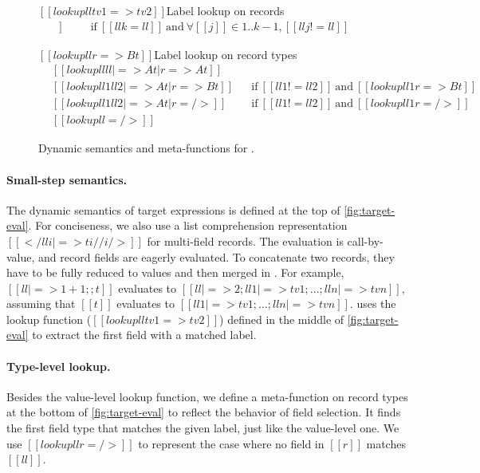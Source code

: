 \begin{figure}
  \small
  \ottdefnsTargetStep

  \begin{rulesection}{$[[ lookup ll tv1 => tv2]]$}{Label lookup on records}
    \begin{align*}
      [[ lookup ll { ll1 |=> tv1 ; ... ; lln |=> tvn }  => tvk ]]\;\;\qquad
      \text{if}\ [[llk=ll]]\ \text{and}\ \forall [[j]] \in 1 .. k\!\!-\!\!1, [[llj != ll]]\;\;
    \end{align*}
  \end{rulesection}

  \begin{rulesection}{$[[ lookup ll r => Bt]]$}{Label lookup on record types}
    \begin{align*}
      &[[ lookup ll {ll |=>At | r} => At ]]&&\\
      &[[ lookup ll1 {ll2 |=>At | r} => Bt ]]&&\text{if}\ [[ll1 != ll2]]\ \text{and}\ [[ lookup ll1 r => Bt ]]\\
      &[[ lookup ll1 {ll2 |=>At | r} =/> ]]&&\text{if}\ [[ll1 != ll2]]\ \text{and}\ [[ lookup ll1 r =/> ]]\\
      &[[ lookup ll {} =/> ]]&&
    \end{align*}
  \end{rulesection}

  \caption{Dynamic semantics and meta-functions for \lambdar.}
  \label{fig:target-eval}
\end{figure}

\paragraph{Small-step semantics.}
The dynamic semantics of target expressions is defined at the top of
\autoref{fig:target-eval}. For conciseness, we also use a list comprehension
representation $[[ { </ lli |=> ti // i /> } ]]$ for multi-field records. The
evaluation is call-by-value, and record fields are eagerly evaluated. To
concatenate two records, they have to be fully reduced to values and then merged
in . For example, $[[{ ll|=>1+1 } ;; t]]$ evaluates to
$[[{ ll |=> 2 ; ll1 |=> tv1 ; ... ; lln |=> tvn }]]$, assuming that $[[t]]$
evaluates to $[[{ ll1 |=> tv1 ; ... ; lln |=> tvn }]]$. 
uses the lookup function ($[[lookup ll tv1 => tv2]]$) defined in the middle of
\autoref{fig:target-eval} to extract the first field with a matched label.

\paragraph{Type-level lookup.}
Besides the value-level lookup function, we define a meta-function on record
types at the bottom of \autoref{fig:target-eval} to reflect the behavior of
field selection. It finds the first field type that matches the given label,
just like the value-level one. We use $[[ lookup ll r =/> ]]$ to represent the
case where no field in $[[r]]$ matches $[[ll]]$.

